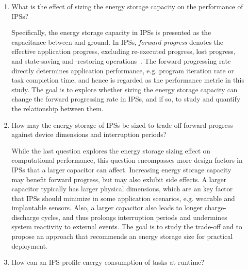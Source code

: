 \begin{enumerate}

\item What is the effect of sizing the energy storage capacity on the performance of IPSs? 

Specifically, the energy storage capacity in IPSs is presented as the capacitance between  and ground. 
In IPSs, \textit{forward progress} denotes the effective application progress, excluding re-executed progress, lost progress, and state-saving and -restoring operations~\cite{7478428}.
The forward progressing rate directly determines application performance, e.g. program iteration rate or task completion time, and hence is regarded as the performance metric in this study. 
The goal is to explore whether sizing the energy storage capacity can change the forward progressing rate in IPSs, and if so, to study and quantify the relationship between them. 

\item How may the energy storage of IPSs be sized to trade off forward progress against device dimensions and interruption periods?

While the last question explores the energy storage sizing effect on computational performance, this question encompasses more design factors in IPSs that a larger capacitor can affect. 
Increasing energy storage capacity may benefit forward progress, but may also exhibit side effects. 
A larger capacitor typically has larger physical dimensions, which are an key factor that IPSs should minimize in some application scenarios, e.g. wearable and implantable sensors. 
Also, a larger capacitor also leads to longer charge-discharge cycles, and thus prolongs interruption periods and undermines system reactivity to external events. 
The goal is to study the trade-off and to propose an approach that recommends an energy storage size for practical deployment.

\item How can an IPS profile energy consumption of tasks at runtime? 


\end{enumerate}
